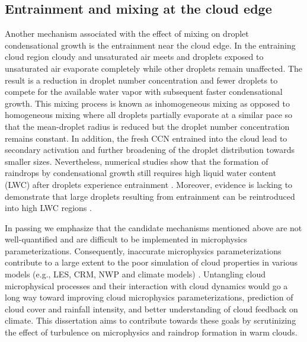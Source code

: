 \subsection{Entrainment and mixing at the cloud edge}
Another mechanism associated with the effect of mixing on droplet condensational growth is the entrainment near the cloud edge. In the entraining cloud region cloudy and unsaturated air meets and droplets exposed to unsaturated air evaporate completely while other droplets remain unaffected. The result is a reduction in droplet number concentration and fewer droplets to compete for the available water vapor with subsequent faster condensational growth. This mixing process is known as inhomogeneous mixing as opposed to homogeneous mixing where all droplets partially evaporate at a similar pace so that the mean-droplet radius is reduced but the droplet number concentration remains constant. In addition, the fresh CCN entrained into the cloud lead to secondary activation and further broadening of the droplet distribution towards smaller sizes. Nevertheless, numerical studies show that the formation of raindrops by condensational growth still requires high liquid water content (LWC) after droplets experience entrainment \citep{Twomey1966}. Moreover, evidence is lacking to demonstrate that large droplets resulting from entrainment can be reintroduced into high LWC regions \citep{cooper2013}.


In passing we emphasize that the candidate mechanisms mentioned above are not well-quantified and are difficult to be implemented in microphysics parameterizations. Consequently, inaccurate microphysics parameterizations contribute to a large extent to the poor simulation of cloud properties in various models (e.g., LES, CRM, NWP and climate models) \citep{Fan2016}. Untangling cloud microphysical processes and their interaction with cloud dynamics would go a long way toward improving cloud microphysics parameterizations, prediction of cloud cover and rainfall intensity, and better understanding of cloud feedback on climate. This dissertation aims to contribute towards these goals by scrutinizing the effect of turbulence on microphysics and raindrop formation in warm clouds. 




